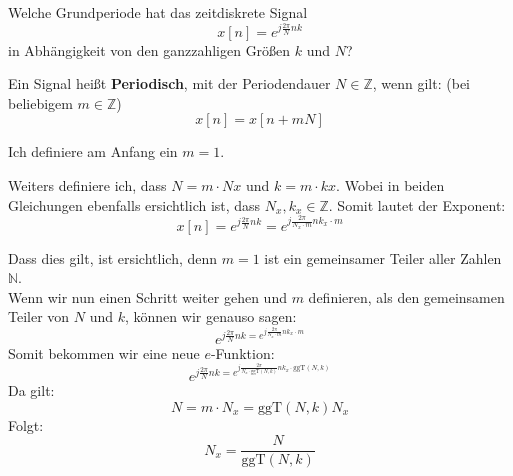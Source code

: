 \begin{uebsp}
\begin{Exercise}
    Welche Grundperiode hat das zeitdiskrete Signal
    \[x[n]=e^{j\frac{2\pi}{N}nk}\]
    in Abhängigkeit von den ganzzahligen Größen $k$ und $N$?
\end{Exercise}
\begin{Answer}
\begin{uebsp_theory}
    Ein Signal heißt \textbf{Periodisch}, mit der Periodendauer $N\in\mathbb{Z}$, wenn gilt: (bei beliebigem $m\in \mathbb{Z}$)
    \[x[n]=x[n+mN]\]
\end{uebsp_theory}

Ich definiere am Anfang ein $m = 1$.

Weiters definiere ich, dass $N = m\cdot Nx$ und $k = m\cdot kx$. Wobei in beiden Gleichungen ebenfalls ersichtlich ist, dass $N_x, k_x \in \mathbb{Z}$.
Somit lautet der Exponent:
\[x[n]=e^{j\frac{2\pi}{N}nk}=e^{j\frac{2\pi}{N_x\cdot m}nk_x\cdot m}\]

Dass dies gilt, ist ersichtlich, denn $m=1$ ist ein gemeinsamer Teiler aller Zahlen $\mathbb N$.\\

Wenn wir nun einen Schritt weiter gehen und $m$ definieren, als den gemeinsamen Teiler von $N$ und $k$, können wir genauso sagen:
\[e^{j\frac{2\pi}{N}nk=e^{j\frac{2\pi}{N_x\cdot m}nk_x\cdot m}}\]
Somit bekommen wir eine neue $e$-Funktion:
\[e^{j\frac{2\pi}{N}nk=e^{j\frac{2\pi}{N_x\cdot \text{ggT}(N,k)}nk_x\cdot \text{ggT}(N,k)}}\]
Da gilt:
\[N=m\cdot N_x=\text{ggT}(N,k)N_x\]
Folgt:
\[N_x=\frac{N}{\text{ggT}(N,k)}\]
\end{Answer}
\end{uebsp}
